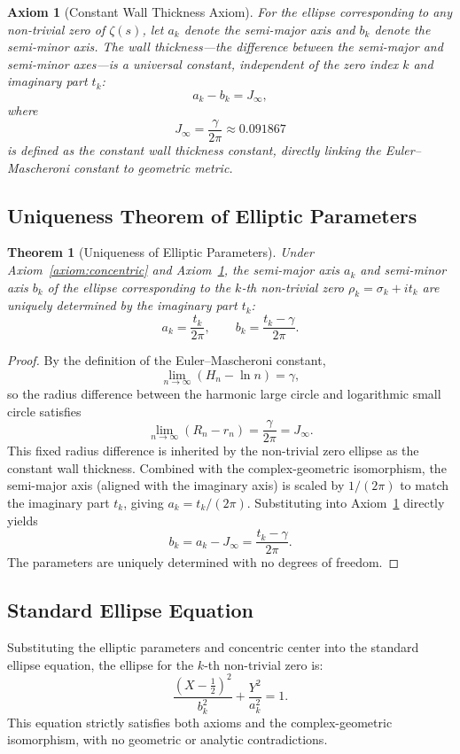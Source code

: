 \documentclass[12pt,a4paper]{article}
\newtheorem{axiom}{Axiom}
\newtheorem{theorem}{Theorem}
\theoremstyle{definition}
\begin{document}
\begin{axiom}[Constant Wall Thickness Axiom]
\label{axiom:wall}
For the ellipse corresponding to any non-trivial zero of $\zeta(s)$, let $a_k$ denote the semi-major axis and $b_k$ denote the semi-minor axis. The wall thickness---the difference between the semi-major and semi-minor axes---is a universal constant, independent of the zero index $k$ and imaginary part $t_k$:
\[
a_k - b_k = J_\infty,
\]
where
\[
J_\infty = \frac{\gamma}{2\pi} \approx 0.091867
\]
is defined as the constant wall thickness constant, directly linking the Euler--Mascheroni constant to geometric metric.
\end{axiom}

\subsection{Uniqueness Theorem of Elliptic Parameters}
\begin{theorem}[Uniqueness of Elliptic Parameters]
\label{thm:params}
Under Axiom~\ref{axiom:concentric} and Axiom~\ref{axiom:wall}, the semi-major axis $a_k$ and semi-minor axis $b_k$ of the ellipse corresponding to the $k$-th non-trivial zero $\rho_k = \sigma_k + i t_k$ are uniquely determined by the imaginary part $t_k$:
\[
\boxed{a_k = \frac{t_k}{2\pi},\qquad b_k = \frac{t_k - \gamma}{2\pi}.}
\]
\end{theorem}

\begin{proof}
By the definition of the Euler--Mascheroni constant,
\[
\lim_{n\to\infty}(H_n - \ln n) = \gamma,
\]
so the radius difference between the harmonic large circle and logarithmic small circle satisfies
\[
\lim_{n\to\infty}(R_n - r_n) = \frac{\gamma}{2\pi} = J_\infty.
\]
This fixed radius difference is inherited by the non-trivial zero ellipse as the constant wall thickness. Combined with the complex-geometric isomorphism, the semi-major axis (aligned with the imaginary axis) is scaled by $1/(2\pi)$ to match the imaginary part $t_k$, giving $a_k = t_k/(2\pi)$. Substituting into Axiom~\ref{axiom:wall} directly yields
\[
b_k = a_k - J_\infty = \frac{t_k - \gamma}{2\pi}.
\]
The parameters are uniquely determined with no degrees of freedom.
\end{proof}

\subsection{Standard Ellipse Equation}
Substituting the elliptic parameters and concentric center into the standard ellipse equation, the ellipse for the $k$-th non-trivial zero is:
\[
\boxed{\frac{\left(X - \frac{1}{2}\right)^2}{b_k^2} + \frac{Y^2}{a_k^2} = 1.}
\]
This equation strictly satisfies both axioms and the complex-geometric isomorphism, with no geometric or analytic contradictions.
\end{document}
